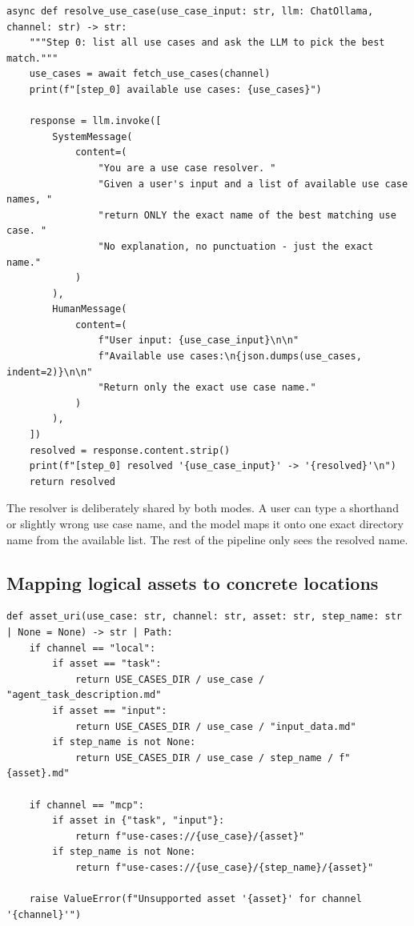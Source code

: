 \documentclass[12pt, a4paper]{article}
\begin{document}
\begin{lstlisting}[style=pythonstyle]
async def resolve_use_case(use_case_input: str, llm: ChatOllama, channel: str) -> str:
    """Step 0: list all use cases and ask the LLM to pick the best match."""
    use_cases = await fetch_use_cases(channel)
    print(f"[step_0] available use cases: {use_cases}")

    response = llm.invoke([
        SystemMessage(
            content=(
                "You are a use case resolver. "
                "Given a user's input and a list of available use case names, "
                "return ONLY the exact name of the best matching use case. "
                "No explanation, no punctuation - just the exact name."
            )
        ),
        HumanMessage(
            content=(
                f"User input: {use_case_input}\n\n"
                f"Available use cases:\n{json.dumps(use_cases, indent=2)}\n\n"
                "Return only the exact use case name."
            )
        ),
    ])
    resolved = response.content.strip()
    print(f"[step_0] resolved '{use_case_input}' -> '{resolved}'\n")
    return resolved
\end{lstlisting}

The resolver is deliberately shared by both modes. A user can type a shorthand or slightly wrong use case name, and the model maps it onto one exact directory name from the available list. The rest of the pipeline only sees the resolved name.

\subsection{Mapping logical assets to concrete locations}

\begin{lstlisting}[style=pythonstyle]
def asset_uri(use_case: str, channel: str, asset: str, step_name: str | None = None) -> str | Path:
    if channel == "local":
        if asset == "task":
            return USE_CASES_DIR / use_case / "agent_task_description.md"
        if asset == "input":
            return USE_CASES_DIR / use_case / "input_data.md"
        if step_name is not None:
            return USE_CASES_DIR / use_case / step_name / f"{asset}.md"

    if channel == "mcp":
        if asset in {"task", "input"}:
            return f"use-cases://{use_case}/{asset}"
        if step_name is not None:
            return f"use-cases://{use_case}/{step_name}/{asset}"

    raise ValueError(f"Unsupported asset '{asset}' for channel '{channel}'")
\end{lstlisting}
\end{document}
